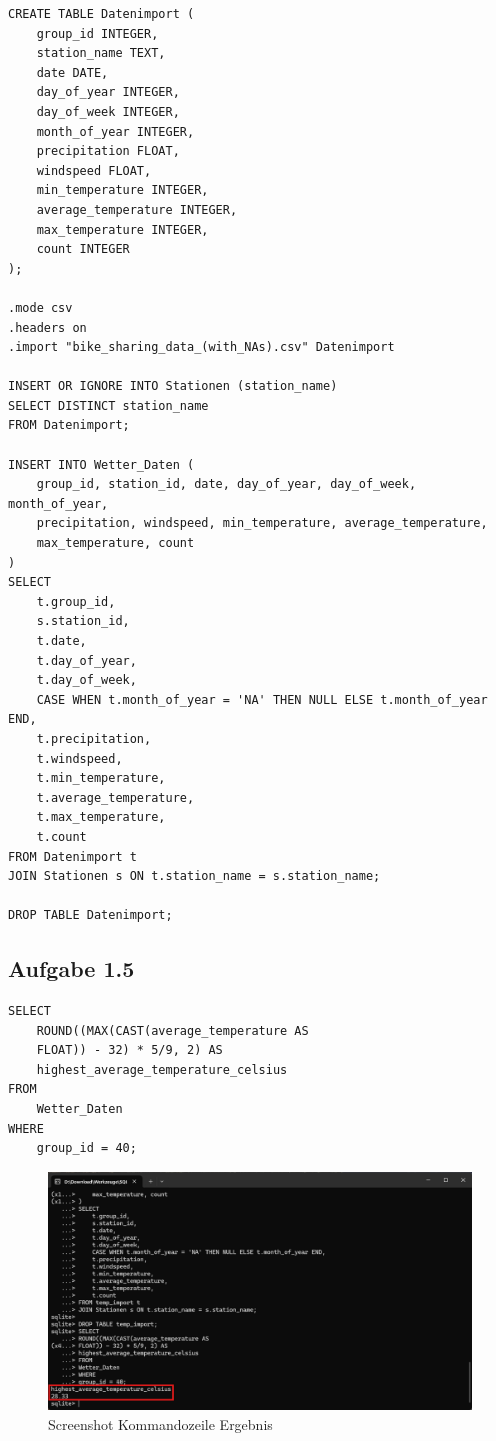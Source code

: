 \documentclass[a4paper, 12pt]{article}
\begin{document}
\newpage
\begin{verbatim}
CREATE TABLE Datenimport (
    group_id INTEGER,
    station_name TEXT,
    date DATE,
    day_of_year INTEGER,
    day_of_week INTEGER,
    month_of_year INTEGER,
    precipitation FLOAT,
    windspeed FLOAT,
    min_temperature INTEGER,
    average_temperature INTEGER,
    max_temperature INTEGER,
    count INTEGER
);

.mode csv
.headers on
.import "bike_sharing_data_(with_NAs).csv" Datenimport

INSERT OR IGNORE INTO Stationen (station_name)
SELECT DISTINCT station_name
FROM Datenimport;

INSERT INTO Wetter_Daten (
    group_id, station_id, date, day_of_year, day_of_week, month_of_year,
    precipitation, windspeed, min_temperature, average_temperature,
    max_temperature, count
)
SELECT 
    t.group_id,
    s.station_id,
    t.date,
    t.day_of_year,
    t.day_of_week,
    CASE WHEN t.month_of_year = 'NA' THEN NULL ELSE t.month_of_year END,
    t.precipitation,
    t.windspeed,
    t.min_temperature,
    t.average_temperature,
    t.max_temperature,
    t.count
FROM Datenimport t
JOIN Stationen s ON t.station_name = s.station_name;

DROP TABLE Datenimport;
\end{verbatim}

\subsection{Aufgabe 1.5}
\begin{verbatim}
SELECT
    ROUND((MAX(CAST(average_temperature AS 
    FLOAT)) - 32) * 5/9, 2) AS
    highest_average_temperature_celsius 
FROM
    Wetter_Daten
WHERE
    group_id = 40;
\end{verbatim}

\begin{figure}[!htb]
\centering
\includegraphics[scale=.4]{Screenshot 2024-12-01 185857}
\caption{Screenshot Kommandozeile Ergebnis}
\label{fig:Screenshot Kommandozeile}
\end{figure}
\end{document}
